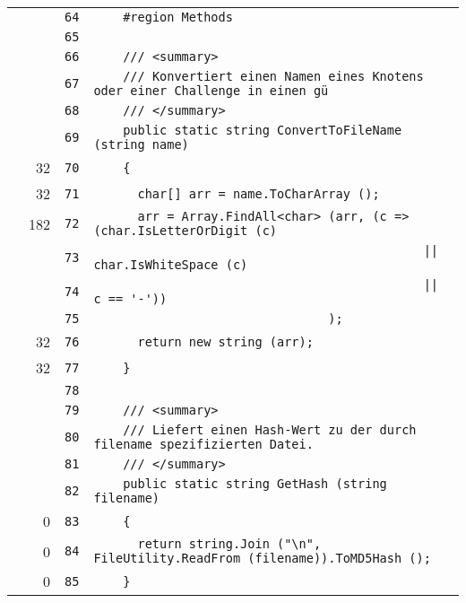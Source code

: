 \documentclass[a4paper,10pt]{article}
\begin{document}
\begin{longtable}[l]{lrrl}
\cellcolor{gray} &  & \verb~64~ & \verb~    #region Methods~\\
\cellcolor{gray} &  & \verb~65~ & \verb~~\\
\cellcolor{gray} &  & \verb~66~ & \verb~    /// <summary>~\\
\cellcolor{gray} &  & \verb~67~ & \verb~    /// Konvertiert einen Namen eines Knotens oder einer Challenge in einen gü~\\
\cellcolor{gray} &  & \verb~68~ & \verb~    /// </summary>~\\
\cellcolor{gray} &  & \verb~69~ & \verb~    public static string ConvertToFileName (string name)~\\
\cellcolor{green} & 32 & \verb~70~ & \verb~    {~\\
\cellcolor{green} & 32 & \verb~71~ & \verb~      char[] arr = name.ToCharArray ();~\\
\cellcolor{green} & 182 & \verb~72~ & \verb~      arr = Array.FindAll<char> (arr, (c => (char.IsLetterOrDigit (c)~\\
\cellcolor{gray} &  & \verb~73~ & \verb~                                             || char.IsWhiteSpace (c)~\\
\cellcolor{gray} &  & \verb~74~ & \verb~                                             || c == '-'))~\\
\cellcolor{gray} &  & \verb~75~ & \verb~                                );~\\
\cellcolor{green} & 32 & \verb~76~ & \verb~      return new string (arr);~\\
\cellcolor{green} & 32 & \verb~77~ & \verb~    }~\\
\cellcolor{gray} &  & \verb~78~ & \verb~~\\
\cellcolor{gray} &  & \verb~79~ & \verb~    /// <summary>~\\
\cellcolor{gray} &  & \verb~80~ & \verb~    /// Liefert einen Hash-Wert zu der durch filename spezifizierten Datei.~\\
\cellcolor{gray} &  & \verb~81~ & \verb~    /// </summary>~\\
\cellcolor{gray} &  & \verb~82~ & \verb~    public static string GetHash (string filename)~\\
\cellcolor{red} & 0 & \verb~83~ & \verb~    {~\\
\cellcolor{red} & 0 & \verb~84~ & \verb~      return string.Join ("\n", FileUtility.ReadFrom (filename)).ToMD5Hash ();~\\
\cellcolor{red} & 0 & \verb~85~ & \verb~    }~\\

\end{longtable}
\end{document}
